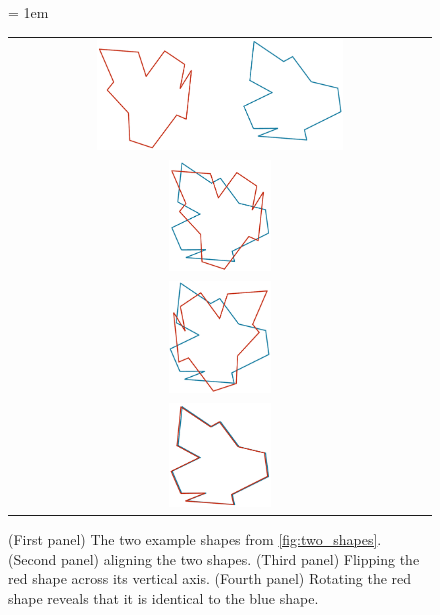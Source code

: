 \begin{figure}[p]
	\centering
	\tabcolsep = 1em
	\mySfFamily
	\begin{tabular}{c}
		\includegraphics[width = 0.6\textwidth]{../images/shape_transformation1.png}\\[2ex]
		\includegraphics[width = 0.25\textwidth]{../images/shape_transformation2.png} \\[2ex]
		\includegraphics[width = 0.25\textwidth]{../images/shape_transformation3.png}\\[2ex]
		\includegraphics[width = 0.25\textwidth]{../images/shape_transformation4.png} \\
	\end{tabular}
	\caption{(First panel) The two example shapes from \autoref{fig:two_shapes}. (Second panel) aligning the two shapes. (Third panel) Flipping the red shape across its vertical axis. (Fourth panel) Rotating the red shape reveals that it is identical to the blue shape.}
	\label{fig:shape_transformation}
\end{figure}

